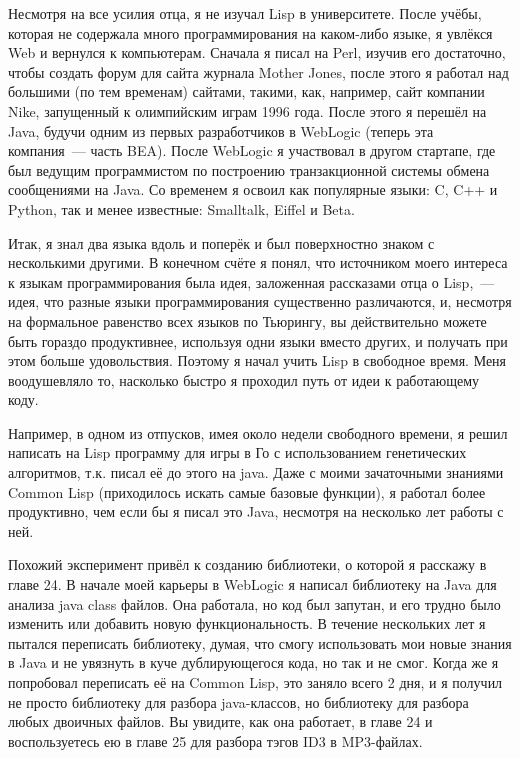 Несмотря на все усилия отца, я не изучал Lisp в университете. После учёбы, которая
не содержала много программирования на каком-либо языке, я увлёкся Web и вернулся к
компьютерам. Сначала я писал на Perl, изучив его достаточно, чтобы создать форум для сайта
журнала Mother Jones, после этого я работал над большими (по тем временам) сайтами,
такими, как, например, сайт компании Nike, запущенный к олимпийским играм 1996 года. После
этого я перешёл на Java, будучи одним из первых разработчиков в WebLogic (теперь эта
компания~--- часть BEA). После WebLogic я участвовал в другом стартапе, где был ведущим
программистом по построению транзакционной системы обмена сообщениями на Java. Со временем
я освоил как популярные языки: C, C++ и Python, так и менее известные: Smalltalk, Eiffel и Beta.

Итак, я знал два языка вдоль и поперёк и был поверхностно знаком с несколькими другими.
В конечном счёте я понял, что источником моего интереса к языкам программирования
была идея, заложенная рассказами отца о Lisp,~--- идея, что разные языки
программирования существенно различаются, и, несмотря на формальное равенство всех языков
по Тьюрингу, вы действительно можете быть гораздо продуктивнее, используя
одни языки вместо других, и получать при этом больше удовольствия. Поэтому я начал учить
Lisp в свободное время. Меня воодушевляло то, насколько быстро я проходил путь от идеи к
работающему коду.

Например, в одном из отпусков, имея около недели свободного времени, я решил написать
на Lisp программу для игры в Го с использованием генетических алгоритмов, т.к. писал её 
до этого на java. Даже с моими зачаточными знаниями Common Lisp (приходилось искать
самые базовые функции), я работал более продуктивно, чем если бы я писал это Java, 
несмотря на несколько лет работы с ней.

Похожий эксперимент привёл к созданию библиотеки, о которой я расскажу в главе 24. В
начале моей карьеры в WebLogic я написал библиотеку на Java для анализа java class файлов. 
Она работала, но код был запутан, и его трудно было изменить или добавить новую функциональность. 
В течение нескольких лет я пытался переписать библиотеку,
думая, что смогу использовать мои новые знания в Java и не увязнуть в куче дублирующегося
кода, но так и не смог. Когда же я попробовал переписать её на Common Lisp, это заняло всего
2 дня, и я получил не просто библиотеку для разбора java-классов, но библиотеку для
разбора любых двоичных файлов. Вы увидите, как она работает, в главе 24 и воспользуетесь
ею в главе 25 для разбора тэгов ID3 в MP3-файлах.


